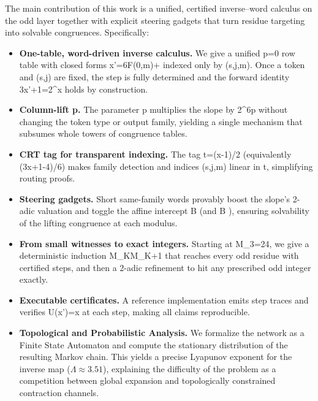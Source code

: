 \documentclass[11pt,letterpaper]{amsart}
\def\({}%
\def\){}%
\theoremstyle{definition}
\theoremstyle{plain}
\theoremstyle{plain}
\theoremstyle{remark}
\begin{document}
The main contribution of this work is a unified, certified inverse--word calculus on the odd layer together with explicit steering gadgets that turn residue targeting into solvable congruences. Specifically:

\begin{itemize}
\item \textbf{One-table, word-driven inverse calculus.}
  We give a unified \(p{=}0\) row table with closed forms \(x'=6F(0,m)+\delta\) indexed only by \((s,j,m)\).
  Once a token and \((s,j)\) are fixed, the step is fully determined and the forward identity
  \(3x'+1=2^{\alpha}x\) holds by construction.

\item \textbf{Column-lift \(p\).}
  The parameter \(p\) multiplies the slope by \(2^{6p}\) without changing the token type or output family, yielding a single mechanism that subsumes whole towers of congruence tables.

\item \textbf{CRT tag for transparent indexing.}
  The tag \(t=(x-1)/2\) (equivalently \((3x+1-4)/6\)) makes family detection and indices
  \((s,j,m)\) linear in \(t\), simplifying routing proofs.

\item \textbf{Steering gadgets.}
  Short same-family words provably boost the slope’s \(2\)-adic valuation and toggle the affine intercept \(B\) (and \(B \)), ensuring solvability of the lifting congruence at each modulus.

\item \textbf{From small witnesses to exact integers.}
  Starting at \(M_3{=}24\), we give a deterministic induction \(M_K\to M_{K+1}\)
  that reaches every odd residue with certified steps, and then a \(2\)-adic refinement to hit any prescribed odd integer exactly.

\item \textbf{Executable certificates.}
  A reference implementation emits step traces and verifies \(U(x')=x\) at each step, making all claims reproducible.

\item \textbf{Topological and Probabilistic Analysis.}
  We formalize the network as a Finite State Automaton and compute the stationary distribution of the resulting Markov chain. This yields a precise Lyapunov exponent for the inverse map ($\Lambda \approx 3.51$), explaining the difficulty of the problem as a competition between global expansion and topologically constrained contraction channels.

\end{itemize}
\end{document}
